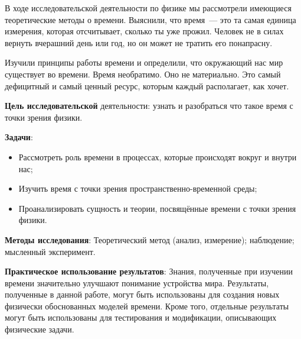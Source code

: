 \bigskip
{}



\makeProcTitleSchool


В ходе исследовательской деятельности по физике мы рассмотрели имеющиеся теоретические методы о времени. Выяснили, что время~--- это та самая единица измерения, которая отсчитывает, сколько ты уже прожил. Человек не в силах вернуть вчерашний день или год, но он может не тратить его понапрасну.

Изучили принципы работы времени и определили, что окружающий нас мир существует во времени. Время необратимо. Оно не материально. Это самый дефицитный и самый ценный ресурс, которым каждый располагает, как хочет.

\textbf{Цель исследовательской} деятельности: узнать и разобраться что такое время с точки зрения физики.

\textbf{Задачи}:
\begin{itemize}[noitemsep]\vspace{-6pt}
\item Рассмотреть роль времени в процессах, которые происходят вокруг и внутри нас;
\item Изучить время с точки зрения пространственно-временной среды;
\item Проанализировать сущность и теории, посвящённые времени с точки зрения физики.
\end{itemize}\vspace{-6pt}

\textbf{Методы исследования}: Теоретический метод (анализ, измерение); наблюдение; мысленный эксперимент.

\textbf{Практическое использование результатов}: Знания, полученные при изучении времени значительно улучшают понимание устройства мира. Результаты, полученные в данной работе, могут быть использованы для создания новых физически обоснованных моделей времени. Кроме того, отдельные результаты могут быть использованы для тестирования и модификации, описывающих физические задачи.
